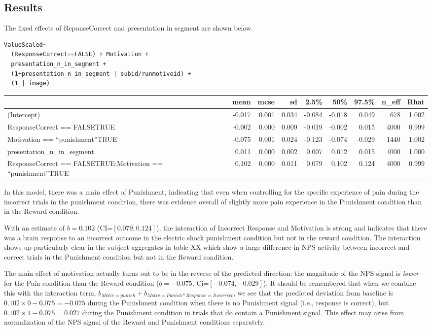 \documentclass[]{article}
\begin{document}
\subsection{Results}\label{results}

The fixed effects of ReponseCorrect and presentation in segment are
shown below.

\begin{verbatim}
ValueScaled~
  (ResponseCorrect==FALSE) + Motivation + 
  presentation_n_in_segment + 
  (1+presentation_n_in_segment | subid/runmotiveid) + 
  (1 | image)
\end{verbatim}

\begin{longtable}[]{@{}lrrrrrrrr@{}}
\toprule
& mean & mcse & sd & 2.5\% & 50\% & 97.5\% & n\_eff &
Rhat\tabularnewline
\midrule
\endhead
(Intercept) & -0.017 & 0.001 & 0.034 & -0.084 & -0.018 & 0.049 & 678 &
1.002\tabularnewline
ResponseCorrect == FALSETRUE & -0.002 & 0.000 & 0.009 & -0.019 & -0.002
& 0.015 & 4000 & 0.999\tabularnewline
Motivation == ``punishment''TRUE & -0.075 & 0.001 & 0.024 & -0.123 &
-0.074 & -0.029 & 1440 & 1.002\tabularnewline
presentation\_n\_in\_segment & 0.011 & 0.000 & 0.002 & 0.007 & 0.012 &
0.015 & 4000 & 1.000\tabularnewline
ResponseCorrect == FALSETRUE:Motivation == ``punishment''TRUE & 0.102 &
0.000 & 0.011 & 0.079 & 0.102 & 0.124 & 4000 & 0.999\tabularnewline
\bottomrule
\end{longtable}

In this model, there was a main effect of Punishment, indicating that
even when controlling for the specific experience of pain during the
incorrect trials in the punishment condition, there was evidence overall
of slightly more pain experience in the Punishment condition than in the
Reward condition.

With an estimate of \(b=0.102\) (CI=\([0.079,0.124]\)), the interaction
of Incorrect Response and Motivation is strong and indicates that there
was a brain response to an incorrect outcome in the electric shock
punishment condition but not in the reward condition. The interaction
shows up particularly clear in the subject aggregates in table XX which
show a large difference in NPS activity between incorrect and correct
trials in the Punishment condition but not in the Reward condition.

The main effect of motivation actually turns out to be in the reverse of
the predicted direction: the magnitude of the NPS signal is \emph{lower}
for the Pain condition than the Reward condition (\(b=-0.075\),
Ci=\([-0.074, -0.029]\)). It should be remembered that when we combine
this with the interaction term,
\(b_{Motiv=punish} + b_{Motiv=Punish*Response=Incorrect}\), we see that
the predicted deviation from baseline is
\(0.102\times 0 - 0.075=-0.075\) during the Punishment condition when
there is no Punishment signal (i.e., response is correct), but
\(0.102\times 1 - 0.075=0.027\) during the Punishment condition in
trials that do contain a Punishment signal. This effect may arise from
normalization of the NPS signal of the Reward and Punishment conditions
separately.
\end{document}
